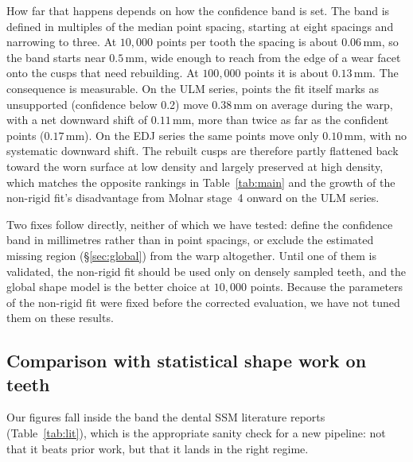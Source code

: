 \documentclass[10pt,a4paper,twocolumn]{article}
\newcommand{\mm}{\,\mathrm{mm}}
\begin{document}
How far that happens depends on how the confidence band is set. The band is
defined in multiples of the median point spacing, starting at eight spacings and
narrowing to three. At $10{,}000$ points per tooth the spacing is about $0.06\mm$,
so the band starts near $0.5\mm$, wide enough to reach from the edge of a wear
facet onto the cusps that need rebuilding. At $100{,}000$ points it is about
$0.13\mm$. The consequence is measurable. On the ULM series, points the fit itself
marks as unsupported (confidence below 0.2) move $0.38\mm$ on average during the
warp, with a net downward shift of $0.11\mm$, more than twice as far as the
confident points ($0.17\mm$). On the EDJ series the same points move only
$0.10\mm$, with no systematic downward shift. The rebuilt cusps are therefore
partly flattened back toward the worn surface at low density and largely
preserved at high density, which matches the opposite rankings in
Table~\ref{tab:main} and the growth of the non-rigid fit's disadvantage from
Molnar stage~4 onward on the ULM series.

Two fixes follow directly, neither of which we have tested: define the confidence
band in millimetres rather than in point spacings, or exclude the estimated
missing region (\S\ref{sec:global}) from the warp altogether. Until one of them is
validated, the non-rigid fit should be used only on densely sampled teeth, and the
global shape model is the better choice at $10{,}000$ points. Because the
parameters of the non-rigid fit were fixed before the corrected evaluation, we have
not tuned them on these results.

\subsection{Comparison with statistical shape work on teeth}
\label{sec:compare}

Our figures fall inside the band the dental SSM literature reports
(Table~\ref{tab:lit}), which is the appropriate sanity check for a new pipeline:
not that it beats prior work, but that it lands in the right regime.
\end{document}
